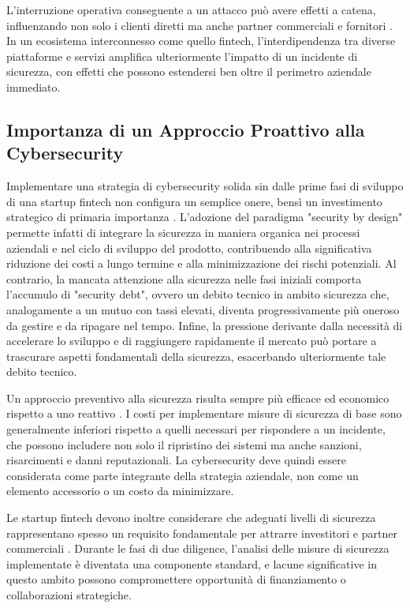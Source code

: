 \documentclass[a4paper,12pt]{report}
\begin{document}
L'interruzione operativa conseguente a un attacco può avere effetti a catena, influenzando non solo i clienti diretti ma anche partner commerciali e fornitori \cite{fintechChallenges}. In un ecosistema interconnesso come quello fintech, l'interdipendenza tra diverse piattaforme e servizi amplifica ulteriormente l'impatto di un incidente di sicurezza, con effetti che possono estendersi ben oltre il perimetro aziendale immediato.

\subsection{Importanza di un Approccio Proattivo alla Cybersecurity}

Implementare una strategia di cybersecurity solida sin dalle prime fasi di sviluppo di una startup fintech non configura un semplice onere, bensì un investimento strategico di primaria importanza \cite{fintechChallenges}. L'adozione del paradigma "security by design" permette infatti di integrare la sicurezza in maniera organica nei processi aziendali e nel ciclo di sviluppo del prodotto, contribuendo alla significativa riduzione dei costi a lungo termine e alla minimizzazione dei rischi potenziali. Al contrario, la mancata attenzione alla sicurezza nelle fasi iniziali comporta l'accumulo di "security debt", ovvero un debito tecnico in ambito sicurezza che, analogamente a un mutuo con tassi elevati, diventa progressivamente più oneroso da gestire e da ripagare nel tempo. Infine, la pressione derivante dalla necessità di accelerare lo sviluppo e di raggiungere rapidamente il mercato può portare a trascurare aspetti fondamentali della sicurezza, esacerbando ulteriormente tale debito tecnico.

Un approccio preventivo alla sicurezza risulta sempre più efficace ed economico rispetto a uno reattivo \cite{fintechChallenges}. I costi per implementare misure di sicurezza di base sono generalmente inferiori rispetto a quelli necessari per rispondere a un incidente, che possono includere non solo il ripristino dei sistemi ma anche sanzioni, risarcimenti e danni reputazionali. La cybersecurity deve quindi essere considerata come parte integrante della strategia aziendale, non come un elemento accessorio o un costo da minimizzare.

Le startup fintech devono inoltre considerare che adeguati livelli di sicurezza rappresentano spesso un requisito fondamentale per attrarre investitori e partner commerciali \cite{fintechChallenges}. Durante le fasi di due diligence, l'analisi delle misure di sicurezza implementate è diventata una componente standard, e lacune significative in questo ambito possono compromettere opportunità di finanziamento o collaborazioni strategiche.
\end{document}
